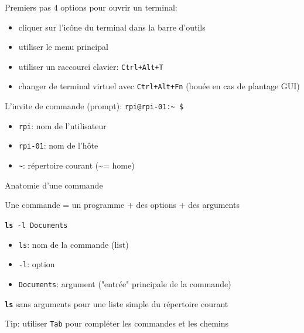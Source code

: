 \documentclass[
aspectratio=169 %
]{beamer}
\newcommand{\cmd}[1]{\texttt{\textbf{#1}}}
\begin{document}
\begin{frame}{Premiers pas} 4 options pour ouvrir un terminal:
    \begin{itemize}
        \item cliquer sur l'icône du terminal dans la barre d'outils
        \item utiliser le menu principal
        \item utiliser un raccourci clavier: \texttt{Ctrl+Alt+T}
        \item changer de terminal virtuel avec \texttt{Ctrl+Alt+Fn} (bouée en
              cas de plantage GUI)
    \end{itemize}

    \bigskip

    L'invite de commande (prompt):
    \texttt{\alert<2>{rpi}@\alert<3>{rpi-01}:\alert<4>{\textasciitilde} \$}
    \begin{itemize}
        \item<2-> \texttt{\alert<2>{rpi}}: nom de l'utilisateur

        \item<3-> \texttt{\alert<3>{rpi-01}}: nom de l'hôte

        \item<4-> \texttt{\alert<4>{\textasciitilde}}: répertoire courant
        (\textasciitilde = home)
    \end{itemize}

\end{frame}

\begin{frame}{Anatomie d'une commande}

    Une commande = un programme + des options + des arguments

    \bigskip

    \texttt{\textbf{ls} -l Documents}

    \begin{itemize}
        \item \texttt{ls}: nom de la commande (list)
        \item \texttt{-l}: option
        \item \texttt{Documents}: argument ("entrée" principale de la commande)
    \end{itemize}

    \bigskip \cmd{ls} sans arguments pour une liste simple du répertoire courant

    \bigskip \alert{Tip:} utiliser \texttt{Tab} pour compléter les commandes et
    les chemins

\end{frame}
\end{document}
